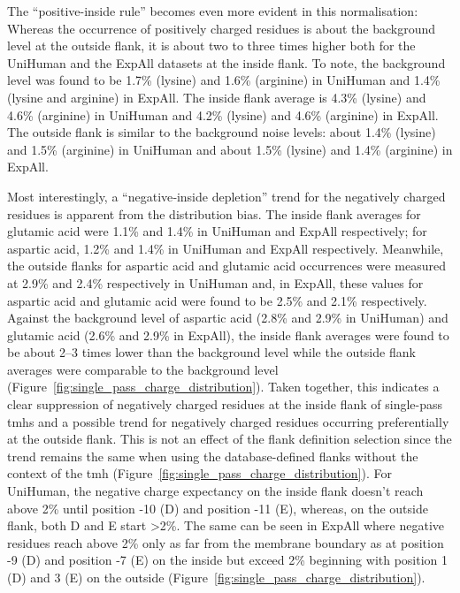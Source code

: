 The “positive-inside rule” becomes even more evident in this normalisation: Whereas the occurrence of positively charged residues is about the background level at the outside flank, it is about two to three times higher both for the UniHuman and the ExpAll datasets at the inside flank. To note, the background level was found to be 1.7\% (lysine) and 1.6\% (arginine) in UniHuman and 1.4\% (lysine and arginine) in ExpAll. The inside flank average is 4.3\% (lysine) and 4.6\% (arginine) in UniHuman and 4.2\% (lysine) and 4.6\% (arginine) in ExpAll. The outside flank is similar to the background noise levels: about 1.4\% (lysine) and 1.5\% (arginine) in UniHuman and about 1.5\% (lysine) and 1.4\% (arginine) in ExpAll.

Most interestingly, a ``negative‑inside depletion'' trend for the negatively charged residues is apparent from the distribution bias. The inside flank averages for glutamic acid were 1.1\% and 1.4\% in UniHuman and ExpAll respectively; for aspartic acid, 1.2\% and 1.4\% in UniHuman and ExpAll respectively. Meanwhile, the outside flanks for aspartic acid and glutamic acid occurrences were measured at 2.9\% and 2.4\% respectively in UniHuman and, in ExpAll, these values for aspartic acid and glutamic acid were found to be 2.5\% and 2.1\% respectively. Against the background level of aspartic acid (2.8\% and 2.9\% in UniHuman) and glutamic acid (2.6\% and 2.9\% in ExpAll), the inside flank averages were found to be about 2--3 times lower than the background level while the outside flank averages were comparable to the background level (Figure~\ref{fig:single_pass_charge_distribution}). Taken together, this indicates a clear suppression of negatively charged residues at the inside flank of single-pass \gls{tmh}s and a possible trend for negatively charged residues occurring preferentially at the outside flank. This is not an effect of the flank definition selection since the trend remains the same when using the database-defined flanks without the context of the \gls{tmh} (Figure~\ref{fig:single_pass_charge_distribution}). For UniHuman, the negative charge expectancy on the inside flank doesn’t reach above 2\% until position -10 (D) and position -11 (E), whereas, on the outside flank, both D and E start >2\%. The same can be seen in ExpAll where negative residues reach above 2\% only as far from the membrane boundary as at position -9 (D) and position -7 (E) on the inside but exceed 2\% beginning with position 1 (D) and 3 (E) on the outside (Figure~\ref{fig:single_pass_charge_distribution}).

